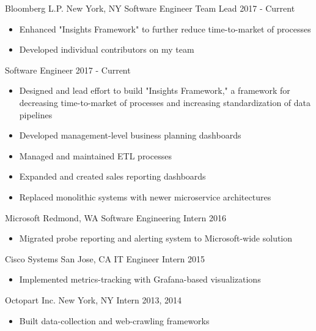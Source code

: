 \documentclass[]{friggeri-cv}
\begin{document}
\begin{entrylist}
  \entryheader
    {Bloomberg L.P.}
    {New York, NY}
  \entry
    {Software Engineer Team Lead}
    {2017 - Current}
    {
    \begin{itemize}
        \item Enhanced "Insights Framework" to further reduce time-to-market of processes
        \item Developed individual contributors on my team
    \end{itemize}
    }
  \entry
    {Software Engineer}
    {2017 - Current}
    {
    \begin{itemize}
        \item Designed and lead effort to build "Insights Framework," a framework for decreasing time-to-market of processes and increasing standardization of data pipelines
        \item Developed management-level business planning dashboards
        \item Managed and maintained ETL processes
        \item Expanded and created sales reporting dashboards
        \item Replaced monolithic systems with newer microservice architectures
    \end{itemize}
    }
  \entryheader
    {Microsoft}
    {Redmond, WA}
  \entry
    {Software Engineering Intern}
    {2016}
    {
    \begin{itemize}
        \item Migrated probe reporting and alerting system to Microsoft-wide solution
    \end{itemize}
    }
  \entryheader
    {Cisco Systems}
    {San Jose, CA}
  \entry
    {IT Engineer Intern}
    {2015}
    {
    \begin{itemize}
        \item Implemented metrics-tracking with Grafana-based visualizations
    \end{itemize}
    }
  \entryheader
    {Octopart Inc.}
    {New York, NY}
  \entry
    {Intern}
    {2013, 2014}
    {
    \begin{itemize}
        \item Built data-collection and web-crawling frameworks
    \end{itemize}
    }
\end{entrylist}
\end{document}
